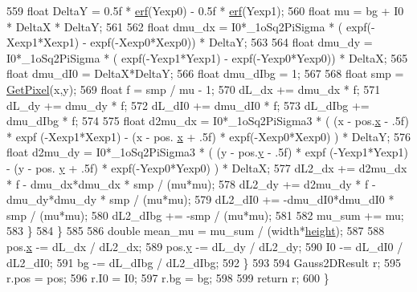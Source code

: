 \begin{DoxyCode}
559                 \textcolor{keywordtype}{float} DeltaY = 0.5f * \hyperlink{utils_8h_ab395c4718c08b423258c297fe9b1cae8}{erf}(Yexp0) - 0.5f * \hyperlink{utils_8h_ab395c4718c08b423258c297fe9b1cae8}{erf}(Yexp1);
560                 \textcolor{keywordtype}{float} mu = bg + I0 * DeltaX * DeltaY;
561                 
562                 \textcolor{keywordtype}{float} dmu\_dx = I0*\_1oSq2PiSigma * ( expf(-Xexp1*Xexp1) - expf(-Xexp0*Xexp0)) * DeltaY;
563 
564                 \textcolor{keywordtype}{float} dmu\_dy = I0*\_1oSq2PiSigma * ( expf(-Yexp1*Yexp1) - expf(-Yexp0*Yexp0)) * DeltaX;
565                 \textcolor{keywordtype}{float} dmu\_dI0 = DeltaX*DeltaY;
566                 \textcolor{keywordtype}{float} dmu\_dIbg = 1;
567         
568                 \textcolor{keywordtype}{float} smp = \hyperlink{class_c_p_u_tracker_afd0e07572adc7f6f70e5e130ff01402b}{GetPixel}(x,y);
569                 \textcolor{keywordtype}{float} f = smp / mu - 1;
570                 dL\_dx += dmu\_dx * f;
571                 dL\_dy += dmu\_dy * f;
572                 dL\_dI0 += dmu\_dI0 * f;
573                 dL\_dIbg += dmu\_dIbg * f;
574 
575                 \textcolor{keywordtype}{float} d2mu\_dx = I0*\_1oSq2PiSigma3 * ( (x - pos.\hyperlink{structvector2_a22b63498d8e4abf9a2da054a247965b9}{x} - .5f) * expf (-Xexp1*Xexp1) - (x - pos.
      \hyperlink{structvector2_a22b63498d8e4abf9a2da054a247965b9}{x} + .5f) * expf(-Xexp0*Xexp0) ) * DeltaY;
576                 \textcolor{keywordtype}{float} d2mu\_dy = I0*\_1oSq2PiSigma3 * ( (y - pos.\hyperlink{structvector2_a00b3268bc895adddf0b72d6acd8274a7}{y} - .5f) * expf (-Yexp1*Yexp1) - (y - pos.
      \hyperlink{structvector2_a00b3268bc895adddf0b72d6acd8274a7}{y} + .5f) * expf(-Yexp0*Yexp0) ) * DeltaX;
577                 dL2\_dx += d2mu\_dx * f - dmu\_dx*dmu\_dx * smp / (mu*mu);
578                 dL2\_dy += d2mu\_dy * f - dmu\_dy*dmu\_dy * smp / (mu*mu);
579                 dL2\_dI0 += -dmu\_dI0*dmu\_dI0 * smp / (mu*mu);
580                 dL2\_dIbg += -smp / (mu*mu);
581 
582                 mu\_sum += mu;
583             \}
584         \}
585 
586         \textcolor{keywordtype}{double} mean\_mu = mu\_sum / (width*\hyperlink{class_c_p_u_tracker_a5d1e01c6a878ff7f0c138f011b0ca5d3}{height});
587 
588         pos.\hyperlink{structvector2_a22b63498d8e4abf9a2da054a247965b9}{x} -= dL\_dx / dL2\_dx;
589         pos.\hyperlink{structvector2_a00b3268bc895adddf0b72d6acd8274a7}{y} -= dL\_dy / dL2\_dy;
590         I0 -= dL\_dI0 / dL2\_dI0;
591         bg -= dL\_dIbg / dL2\_dIbg;
592     \}
593 
594     Gauss2DResult r;
595     r.pos = pos;
596     r.I0 = I0;
597     r.bg = bg;
598 
599     \textcolor{keywordflow}{return} r;
600 \}
\end{DoxyCode}
